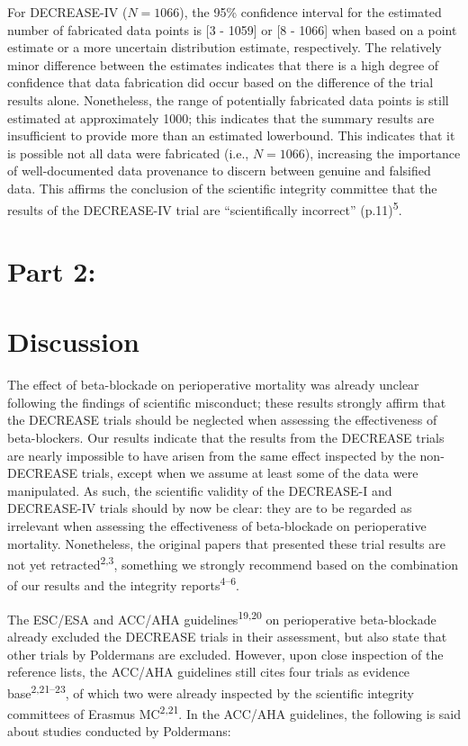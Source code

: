 \documentclass[]{article}
\begin{document}
For DECREASE-IV (\(N=1066\)), the 95\% confidence interval for the
estimated number of fabricated data points is {[}3 - 1059{]} or {[}8 -
1066{]} when based on a point estimate or a more uncertain distribution
estimate, respectively. The relatively minor difference between the
estimates indicates that there is a high degree of confidence that data
fabrication did occur based on the difference of the trial results
alone. Nonetheless, the range of potentially fabricated data points is
still estimated at approximately 1000; this indicates that the summary
results are insufficient to provide more than an estimated lowerbound.
This indicates that it is possible not all data were fabricated (i.e.,
\(N=1066\)), increasing the importance of well-documented data
provenance to discern between genuine and falsified data. This affirms
the conclusion of the scientific integrity committee that the results of
the DECREASE-IV trial are ``scientifically incorrect''
(p.11)\textsuperscript{5}.

\section{Part 2:}\label{part-2}

\section{Discussion}\label{discussion}

The effect of beta-blockade on perioperative mortality was already
unclear following the findings of scientific misconduct; these results
strongly affirm that the DECREASE trials should be neglected when
assessing the effectiveness of beta-blockers. Our results indicate that
the results from the DECREASE trials are nearly impossible to have
arisen from the same effect inspected by the non-DECREASE trials, except
when we assume at least some of the data were manipulated. As such, the
scientific validity of the DECREASE-I and DECREASE-IV trials should by
now be clear: they are to be regarded as irrelevant when assessing the
effectiveness of beta-blockade on perioperative mortality. Nonetheless,
the original papers that presented these trial results are not yet
retracted\textsuperscript{2,3}, something we strongly recommend based on
the combination of our results and the integrity
reports\textsuperscript{4--6}.

The ESC/ESA and ACC/AHA guidelines\textsuperscript{19,20} on
perioperative beta-blockade already excluded the DECREASE trials in
their assessment, but also state that other trials by Poldermans are
excluded. However, upon close inspection of the reference lists, the
ACC/AHA guidelines still cites four trials as evidence
base\textsuperscript{2,21--23}, of which two were already inspected by
the scientific integrity committees of Erasmus MC\textsuperscript{2,21}.
In the ACC/AHA guidelines, the following is said about studies conducted
by Poldermans:
\end{document}
